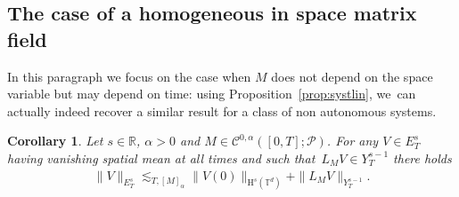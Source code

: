 \documentclass[JEP,XML,SOM,Unicode,published]{cedram}
\newtheorem{coro}[prop]{Corollary}
\theoremstyle{definition}
\newcommand\R{\mathbb{R}}
\newcommand\T{\mathbb{T}}
\renewcommand\H{\mathrm{H}}
\begin{document}
\subsection{The case of a homogeneous in space matrix field}\label{sct:homogeneous}
In this paragraph we focus on the case when $M$ does not depend on the space variable but may depend on time: using Proposition~\ref{prop:systlin}, we~can actually indeed recover a similar result for a class of non autonomous systems.
\begin{coro}\label{coro:systlinbis}
Let $s\in\R$, $\alpha>0$ and $M\in {\mathscr{C}^{0,\alpha}}([0,T];\mathscr{P})$. For any $V\in E_T^s$ having vanishing spatial mean at all times and such that~$L_{M }V\in Y_T^{s-1}$ there holds
\begin{align}\label{eq:estimate non autonomous}
\|V\|_{E_T^s} \lesssim_{T,[M]_\alpha} \|V (0)\|_{\H^s(\T^d)} + \|L_{M }V\|_{Y_T^{s-1}}.
\end{align}
\end{coro}
\end{document}
